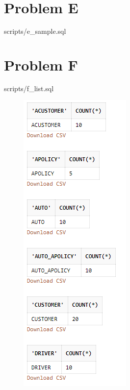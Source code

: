 \documentclass[12pt,english, openany]{book}
\begin{document}
\section{Problem E}
 {scripts/e_sample.sql}
\section{Problem F}
{scripts/f_list.sql}

\begin{figure}[H]
        \centering
        \includegraphics[scale=0.5]{f1.png}
\end{figure}
\end{document}
